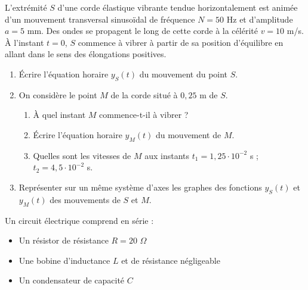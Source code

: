 \documentclass[11pt]{article}
\begin{document}
L'extrémité $S$ d'une corde élastique vibrante tendue horizontalement est animée d'un mouvement transversal sinusoïdal de fréquence $N = 50$ Hz et d'amplitude $a = 5$ mm. Des ondes se propagent le long de cette corde à la célérité $v = 10$ m/s. À l'instant $t = 0$, $S$ commence à vibrer à partir de sa position d'équilibre en allant dans le sens des élongations positives.

\begin{enumerate}
  \item Écrire l'équation horaire $y_S(t)$ du mouvement du point $S$.
  \item On considère le point $M$ de la corde situé à $0{,}25$ m de $S$.
  \begin{enumerate}[label=\alph*.]
    \item À quel instant $M$ commence-t-il à vibrer ?
    \item Écrire l'équation horaire $y_M(t)$ du mouvement de $M$.
    \item Quelles sont les vitesses de $M$ aux instants $t_1 = 1{,}25\cdot10^{-2}$ s ; $t_2 = 4{,}5\cdot10^{-2}$ s.
  \end{enumerate}
  \item Représenter sur un même système d'axes les graphes des fonctions $y_S(t)$ et $y_M(t)$ des mouvements de $S$ et $M$.
\end{enumerate}

Un circuit électrique comprend en série :
\begin{itemize}
  \item Un résistor de résistance $R = 20$ $\Omega$
  \item Une bobine d'inductance $L$ et de résistance négligeable
  \item Un condensateur de capacité $C$
\end{itemize}
\end{document}
